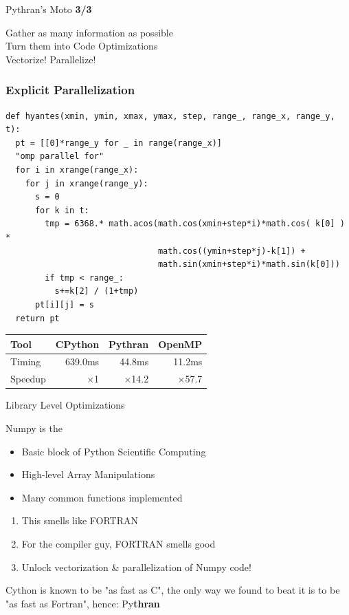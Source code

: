 \documentclass[aspectratio=1610]{beamer}
\begin{document}
\begin{frame}{Pythran's Moto \textbf{3/3}}
    \begin{center}
Gather as many information as possible\\
\vfill
Turn them into Code Optimizations\\
\vfill
\Large Vectorize! Parallelize!
\end{center}
\end{frame}

\begin{frame}[fragile]
    \frametitle{Explicit Parallelization}
            \begin{lstlisting}[basicstyle=\ttfamily\scriptsize]
def hyantes(xmin, ymin, xmax, ymax, step, range_, range_x, range_y, t):
  pt = [[0]*range_y for _ in range(range_x)]
  "omp parallel for"
  for i in xrange(range_x):
    for j in xrange(range_y):
      s = 0
      for k in t:
        tmp = 6368.* math.acos(math.cos(xmin+step*i)*math.cos( k[0] ) *
                               math.cos((ymin+step*j)-k[1]) +
                               math.sin(xmin+step*i)*math.sin(k[0]))
        if tmp < range_:
          s+=k[2] / (1+tmp)
      pt[i][j] = s
  return pt
\end{lstlisting}
\vfill
    \begin{tabular}{|l|r|r|r|}
        \hline
     Tool    &  CPython    &   Pythran     & OpenMP   \\
    \hline
     Timing  &  639.0ms    &   44.8ms       &      11.2ms       \\
    \hline
     Speedup &  $\times$1         &    $\times$14.2      &    $\times$57.7   \\
    \hline
\end{tabular}
\end{frame}

\begin{frame}{Library Level Optimizations}
    \begin{block}{Numpy is the }
        \begin{itemize}
            \item Basic block of Python Scientific Computing
            \item High-level Array Manipulations
            \item Many common functions implemented
        \end{itemize}
    \end{block}
    \begin{enumerate}
        \item This smells like FORTRAN
        \item For the compiler guy, FORTRAN smells good
        \item Unlock vectorization \& parallelization of Numpy code!
    \end{enumerate}
    
    \vfill
    \begin{center}
    \scriptsize{Cython is known to be "as fast as C", the only way we found to beat it is to be "as fast as Fortran", hence: Py\textbf{thran}}
    \end{center}
    
\end{frame}
\end{document}
